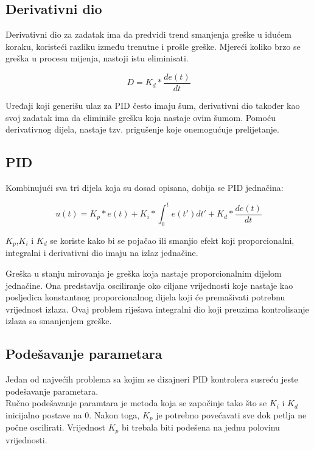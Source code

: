 \documentclass[../Document.tex]{subfiles}
\begin{document}
\subsection{Derivativni dio}
Derivativni dio za zadatak ima da predvidi trend smanjenja greške u idućem koraku, koristeći razliku između trenutne i prošle greške. Mjereći koliko brzo se greška u procesu mijenja, nastoji istu eliminisati.

$$
    D=K_d*\frac{de(t)}{dt}
$$

\noindent Uređaji koji generišu ulaz za PID često imaju šum, derivativni dio također kao svoj zadatak ima da eliminiše grešku koja nastaje ovim šumom. Pomoću derivativnog dijela, nastaje tzv. prigušenje koje onemogućuje prelijetanje.
\clearpage

\subsection{PID}
Kombinujući sva tri dijela koja su dosad opisana, dobija se PID jednačina:

$$
    u(t)=K_p*e(t) + K_i*\int_{0}^{t}e(t')dt' + K_d*\frac{de(t)}{dt}
$$

\noindent $K_p$,$K_i$ i $K_d$ se koriste kako bi se pojačao ili smanjio efekt koji proporcionalni, integralni i derivativni dio imaju na izlaz jednačine.\\


\noindent Greška u stanju mirovanja je greška koja nastaje proporcionalnim dijelom jednačine. Ona predstavlja osciliranje oko ciljane vrijednosti koje nastaje kao posljedica konstantnog proporcionalnog dijela koji će premašivati potrebnu vrijednost izlaza. Ovaj problem riješava integralni dio koji preuzima kontrolisanje izlaza sa smanjenjem greške.


\subsection{Podešavanje parametara}
Jedan od najvećih problema sa kojim se dizajneri PID kontrolera susreću jeste podešavanje parametara.\\

\noindent Ručno podešavanje paramtara je metoda koja se započinje tako što se $K_i$ i $K_d$ inicijalno postave na 0. Nakon toga, $K_p$ je potrebno povećavati sve dok petlja ne počne oscilirati. Vrijednost $K_p$ bi trebala biti podešena na jednu polovinu vrijednosti.
\end{document}
